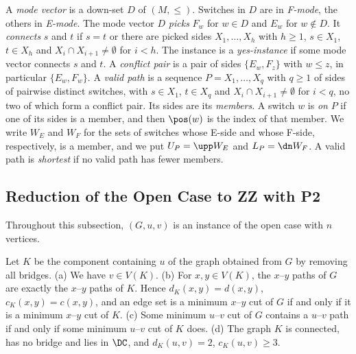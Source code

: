 \begin{definition}
\label{def:zz-valid}
A \emph{mode vector} is a down-set $D$ of $(M, \leq)$.
Switches in $D$ are in \emph{F-mode}, the others in \emph{E-mode}.
The mode vector $D$ \emph{picks} $F_w$ for $w \in D$ and $E_w$ for $w \notin D$.
It \emph{connects} $s$ and $t$ if $s = t$ or there are picked sides $X_1, \dots, X_h$ with $h \geq 1$, $s \in X_1$, $t \in X_h$ and $X_i \cap X_{i+1} \neq \emptyset$ for $i < h$.
The instance is a \emph{yes-instance} if some mode vector connects $s$ and $t$.
A \emph{conflict pair} is a pair of sides $\{E_w, F_z\}$ with $w \leq z$, in particular $\{E_w, F_w\}$.
A \emph{valid path} is a sequence $P = X_1, \dots, X_q$ with $q \geq 1$ of sides of pairwise distinct switches, with $s \in X_1$, $t \in X_q$ and $X_i \cap X_{i+1} \neq \emptyset$ for $i < q$, no two of which form a conflict pair.
Its sides are its \emph{members}.
A switch $w$ is \emph{on} $P$ if one of its sides is a member, and then $\pos(w)$ is the index of that member.
We write $W_E$ and $W_F$ for the sets of switches whose E-side and whose F-side, respectively, is a member, and we put $U_P = \upp W_E$ and $L_P = \dn W_F$.
A valid path is \emph{shortest} if no valid path has fewer members.
\end{definition}

\subsection{Reduction of the Open Case to ZZ with P2}
\label{sec:zz-reduction}

Throughout this subsection, $(G, u, v)$ is an instance of the open case with $n$ vertices.

\begin{lemma}[Bridges]
\label{lem:zz-bridges}
Let $K$ be the component containing $u$ of the graph obtained from $G$ by removing all bridges.
(a) We have $v \in V(K)$.
(b) For $x, y \in V(K)$, the $x$--$y$ paths of $G$ are exactly the $x$--$y$ paths of $K$.
Hence $d_K(x, y) = d(x, y)$, $c_K(x, y) = c(x, y)$, and an edge set is a minimum $x$--$y$ cut of $G$ if and only if it is a minimum $x$--$y$ cut of $K$.
(c) Some minimum $u$--$v$ cut of $G$ contains a $u$--$v$ path if and only if some minimum $u$--$v$ cut of $K$ does.
(d) The graph $K$ is connected, has no bridge and lies in $\DC$, and $d_K(u, v) = 2$, $c_K(u, v) \geq 3$.
\end{lemma}

